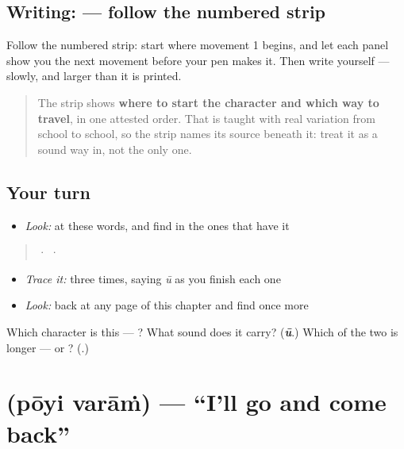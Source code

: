 \subsection*{Writing:  — follow the numbered strip}

Follow the numbered strip: start where movement 1 begins, and let each panel show you the next movement before your pen makes it. Then write  yourself — slowly, and larger than it is printed.

\begin{quote}
The strip shows \textbf{where to start the character and which way to travel}, in one attested order. That is taught with real variation from school to school, so the strip names its source beneath it: treat it as a sound way in, not the only one.
\end{quote}

\subsection*{Your turn}
\begin{itemize}
\raggedright
  \item \emph{Look:} at these words, and find  in the ones that have it
\end{itemize}

\begin{quote}
  ·    ·  
\end{quote}

\begin{itemize}
\raggedright
  \item \emph{Trace it:}  three times, saying \emph{ū} as you finish each one
  \item \emph{Look:} back at any page of this chapter and find  once more
\end{itemize}

\begin{tcolorbox}[breakable,colback=teal!4,colframe=teal!35!black,title={Before you move on}]
Which character is this — ? What sound does it carry? (\emph{\textbf{ū}}.) Which of the two is longer —  or ? (.)
\end{tcolorbox}
\section[\texorpdfstring{\ml{പോയി} \ml{വരാം} (pōyi varāṁ)}{പോയി വരാം (pōyi varāṁ)}]{  (pōyi varāṁ) — \textquotedblleft{}I'll go and come back\textquotedblright{}}

